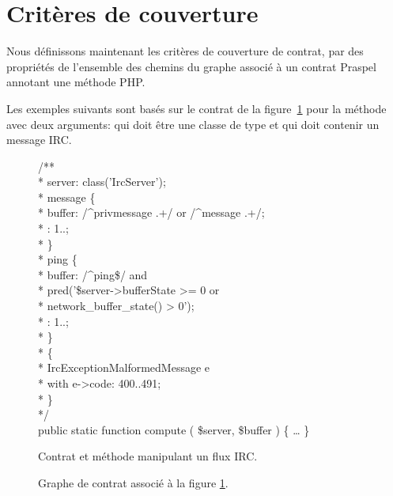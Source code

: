 \section{Critères de couverture}
\label{section:test:criteria}

Nous définissons maintenant les critères de couverture de contrat, par des
propriétés de l'ensemble des chemins du graphe associé à un contrat Praspel
annotant une méthode PHP.

Les exemples suivants sont basés sur le contrat de la
figure~\ref{figure:test:irc} pour la méthode  avec deux arguments:
 qui doit être une classe de type
 et  qui doit contenir un message
IRC.
%
\begin{figure}

\begin{bigpre}
/** \\
 * \arequires server: class('\bslash{}Irc\bslash{}Server'); \\
 * \abehavior message \{ \\
 *     \arequires buffer: /^privmessage .+/ or /^message .+/; \\
 *     \aensures  \aresult: 1..; \\
 * \} \\
 * \abehavior ping \{ \\
 *     \arequires buffer: /^ping\$/ and \\
 *               \bslash{}pred('\$server->bufferState   >= 0 or \\
 *                      network\_buffer\_state() >  0'); \\
 *     \aensures  \aresult: 1..; \\
 * \} \\
 * \adefault \{ \\
 *     \athrowable \bslash{}Irc\bslash{}Exception\bslash{}MalformedMessage e \\
 *                    with e->code: 400..491; \\
 * \} \\
 */ \\
public static function compute ( \$server, \$buffer ) \{ … \}
\end{bigpre}

\caption{\label{figure:test:irc} Contrat et méthode manipulant un flux IRC.}

\end{figure}
%
\begin{figure}


\caption{\label{figure:test:irc_graph} Graphe de contrat associé à la figure
\ref{figure:test:irc}.}

\end{figure}
